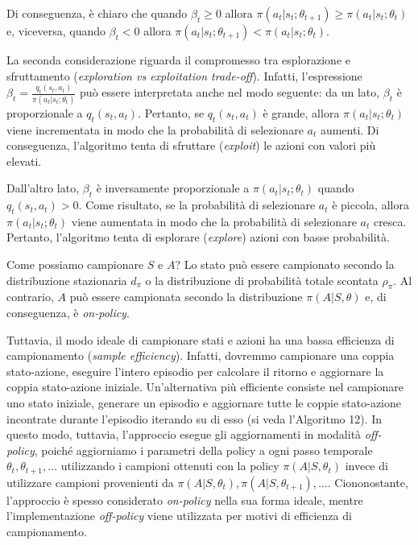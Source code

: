 ﻿\documentclass[11pt, a4paper]{report}
\begin{document}
Di conseguenza, è chiaro che quando $\beta_t \ge 0$ allora $\pi(a_t | s_t; \theta_{t+1}) \ge \pi(a_t | s_t; \theta_t)$ e, viceversa, quando $\beta_t < 0$ allora $\pi(a_t | s_t; \theta_{t+1}) < \pi(a_t | s_t; \theta_t)$.

La seconda considerazione riguarda il compromesso tra esplorazione e sfruttamento (\emph{exploration vs exploitation trade-off}). Infatti, l'espressione $\beta_t = \frac{q_t(s_t, a_t)}{\pi(a_t | s_t; \theta_t)}$ può essere interpretata anche nel modo seguente: da un lato, $\beta_t$ è proporzionale a $q_t(s_t, a_t)$. Pertanto, se $q_t(s_t, a_t)$ è grande, allora $\pi(a_t | s_t; \theta_t)$ viene incrementata in modo che la probabilità di selezionare $a_t$ aumenti. Di conseguenza, l'algoritmo tenta di sfruttare (\emph{exploit}) le azioni con valori più elevati.

Dall'altro lato, $\beta_t$ è inversamente proporzionale a $\pi(a_t | s_t; \theta_t)$ quando $q_t(s_t, a_t) > 0$. Come risultato, se la probabilità di selezionare $a_t$ è piccola, allora $\pi(a_t | s_t; \theta_t)$ viene aumentata in modo che la probabilità di selezionare $a_t$ cresca. Pertanto, l'algoritmo tenta di esplorare (\emph{explore}) azioni con basse probabilità.

Come possiamo campionare $S$ e $A$? Lo stato può essere campionato secondo la distribuzione stazionaria $d_\pi$ o la distribuzione di probabilità totale scontata $\rho_\pi$. Al contrario, $A$ può essere campionata secondo la distribuzione $\pi(A|S, \theta)$ e, di conseguenza, è \emph{on-policy}.

Tuttavia, il modo ideale di campionare stati e azioni ha una bassa efficienza di campionamento (\emph{sample efficiency}). Infatti, dovremmo campionare una coppia stato-azione, eseguire l'intero episodio per calcolare il ritorno e aggiornare la coppia stato-azione iniziale. Un'alternativa più efficiente consiste nel campionare uno stato iniziale, generare un episodio e aggiornare tutte le coppie stato-azione incontrate durante l'episodio iterando su di esso (si veda l'Algoritmo 12). In questo modo, tuttavia, l'approccio esegue gli aggiornamenti in modalità \emph{off-policy}, poiché aggiorniamo i parametri della policy a ogni passo temporale $\theta_t, \theta_{t+1}, \dots$ utilizzando i campioni ottenuti con la policy $\pi(A|S, \theta_t)$ invece di utilizzare campioni provenienti da $\pi(A|S, \theta_t), \pi(A|S, \theta_{t+1}), \dots$. Ciononostante, l'approccio è spesso considerato \emph{on-policy} nella sua forma ideale, mentre l'implementazione \emph{off-policy} viene utilizzata per motivi di efficienza di campionamento.
\end{document}
